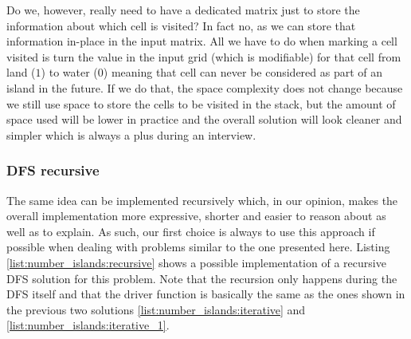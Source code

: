 Do we, however,  really need to have a dedicated matrix just to store the information about which cell is visited?
In fact no, as we can store that information in-place in the input matrix. All we have to do when marking a cell visited is turn
the value in the input grid (which is modifiable) for that cell from land ($1$) to water ($0$) meaning that cell can never be considered as part
of an island in the future. If we do that, the space complexity does not change because we still use
space to store the cells to be visited in the stack,
but the amount of space used will be lower in practice and the overall solution will look cleaner and simpler which is always a plus during an
interview. 



\subsubsection{DFS recursive}
\label{sec:num_island:recursive}
The same idea can be implemented recursively which, in our opinion,  makes the
overall implementation more expressive, shorter and easier to reason about as well as to explain.  As such, our first choice is always to
use this approach if possible when dealing with problems similar to the one presented here.
Listing \ref{list:number_islands:recursive} shows a possible implementation of a recursive DFS solution for
this problem. 
Note that the recursion only happens during the DFS itself and that the driver
function  is basically the same as the ones shown in the
previous two solutions \ref{list:number_islands:iterative} and
\ref{list:number_islands:iterative_1}.

